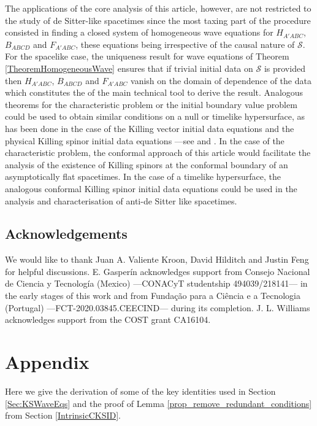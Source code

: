 \documentclass[10pt,a4paper]{article}
\theoremstyle{plain}
\begin{document}
The applications of the core analysis of this article, however,
are not restricted to the study of de Sitter-like spacetimes since the most taxing part of the procedure
consisted in finding a closed system of homogeneous wave equations for
$H_{A'ABC}$, $B_{ABCD}$ and $F_{A'ABC}$, these equations being irrespective of
the causal nature of $\mathcal{S}$. For the spacelike case, the
uniqueness result for wave equations of Theorem
\ref{TheoremHomogeneousWave} ensures that if trivial initial data on
$\mathcal{S}$ is provided then $H_{A'ABC}$, $B_{ABCD}$ and $F_{A'ABC}$
vanish on the domain of dependence of the data which constitutes the
of the main technical tool to derive the result.
Analogous theorems for the characteristic problem or
the initial boundary value problem could be used to obtain similar
conditions on a null or timelike hypersurface, as has been done
in the case of the Killing vector initial data equations and the
physical Killing spinor initial data equations
---see \cite{Pae14a, ColRacVal18} and \cite{CarVal18}.
In the case of the characteristic problem, the conformal approach of
this article would facilitate the analysis of the existence of Killing spinors
at the conformal boundary of an asymptotically flat spacetimes.  In the
case of a timelike hypersurface, the analogous conformal Killing
spinor initial data equations could be used in the analysis and
characterisation of anti-de Sitter like spacetimes.


\subsection*{Acknowledgements}

We would like to thank Juan A. Valiente Kroon, David Hilditch and Justin Feng for helpful discussions.
E. Gasper\'in acknowledges support from Consejo Nacional de
Ciencia y Tecnolog\'ia (Mexico) ---CONACyT studentship
494039/218141--- in the early stages of this work and from Fundaç\~ao
para a Ci\^encia e a Tecnologia (Portugal) ---FCT-2020.03845.CEECIND---
during its completion. J. L. Williams acknowledges support from the COST grant CA16104.  
\appendix

\section{Appendix}\label{Appendix_A}

Here we give the derivation of some of the key identities used in Section \ref{Sec:KSWaveEqs} and the proof of Lemma \ref{prop_remove_redundant_conditions} from Section \ref{IntrinsicCKSID}. 
\end{document}
